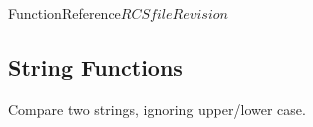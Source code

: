 \begin{cactuspart}{FunctionReference}{$RCSfile$}{$Revision$}
















\subsection{String Functions}

\begin{Lentry}

\item[Util\_StrCmpi]
     [\pageref{Util-StrCmpi}]
Compare two strings, ignoring upper/lower case.


\end{Lentry}
\end{cactuspart}
